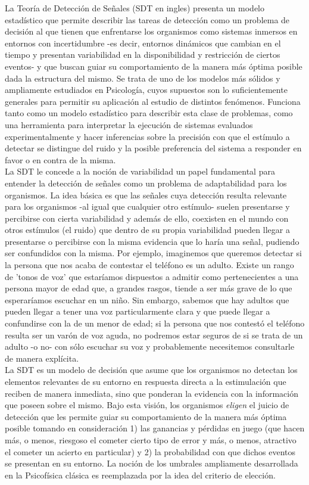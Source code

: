 La Teoría de Detección de Señales (SDT en ingles) presenta un modelo estadístico que permite describir las tareas de detección como un problema de decisión al que tienen que enfrentarse los organismos como sistemas inmersos en entornos con incertidumbre -es decir, entornos dinámicos que cambian en el tiempo y presentan variabilidad en la disponibilidad y restricción de ciertos eventos- y que buscan guiar su comportamiento de la manera más óptima posible dada la estructura del mismo. Se trata de uno de los modelos más sólidos y ampliamente estudiados en Psicología, cuyos supuestos son lo suficientemente generales para permitir su aplicación al estudio de distintos fenómenos. Funciona tanto como un modelo estadístico para describir esta clase de problemas, como una herramienta para interpretar la ejecución de  sistemas evaluados experimentalmente y hacer inferencias sobre la precisión con que el estímulo a detectar se distingue del ruido y la posible preferencia del sistema a responder en favor o en contra de la misma.\\

La SDT le concede a la noción de variabilidad un papel fundamental para entender la detección de señales como un problema de adaptabilidad para los organismos. La idea básica es que las señales cuya detección resulta relevante para los organismos -al igual que cualquier otro estímulo- suelen presentarse y percibirse con cierta variabilidad y además de ello, coexisten en el mundo con otros estímulos (el ruido) que dentro de su propia variabilidad pueden llegar a presentarse o percibirse con la misma evidencia que lo haría una señal, pudiendo ser confundidos con la misma. Por ejemplo, imaginemos que queremos detectar si la persona que nos acaba de contestar el teléfono es un adulto. Existe un rango de 'tonos de voz' que estaríamos dispuestos a admitir como pertenecientes a una persona mayor de edad que, a grandes rasgos, tiende a ser más grave de lo que esperaríamos escuchar en un niño. Sin embargo, sabemos que hay adultos que pueden llegar a tener una voz particularmente clara y que puede llegar a confundirse con la de un menor de edad; si la persona que nos contestó el teléfono resulta ser un varón de voz aguda, no podremos estar seguros de si se trata de un adulto -o no- con sólo escuchar su voz y probablemente necesitemos consultarle de manera explícita.\\

La SDT es un modelo de decisión que asume que los organismos no detectan los elementos relevantes de su entorno en respuesta directa a la estimulación que reciben de manera inmediata, sino que ponderan la evidencia con la información que poseen sobre el mismo. Bajo esta visión, los organismos \textit{eligen} el juicio de detección que les permite guiar su comportamiento de la manera más óptima posible tomando en consideración 1) las ganancias y pérdidas en juego (que hacen más, o menos, riesgoso el cometer cierto tipo de error y más, o menos, atractivo el cometer un acierto en particular) y 2) la probabilidad con que dichos eventos se presentan en su entorno.  La noción de los umbrales ampliamente desarrollada en la Psicofísica clásica es reemplazada por la idea del criterio de elección.\\ 

